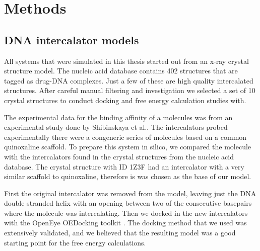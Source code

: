 \chapter{Methods}

\section{DNA intercalator models}

All systems that were simulated in this thesis started out from an x-ray crystal structure model. The nucleic acid database \cite{berman1992nucleic} contains 402 structures that are tagged as drug-DNA complexes. Just a few of these are high quality intercalated structures. After careful manual filtering and investigation we selected a set of 10 crystal structures to conduct docking and free energy calculation studies with.

The experimental data for the binding affinity of a molecules was from an experimental study done by Shibinskaya et al.\cite{shibinskaya2011synthesis}. The intercalators probed experimentally there were a congeneric series of molecules based on a common quinoxaline scaffold. To prepare this system in silico, we compared the molecule with the intercalators found in the crystal structures from the nucleic acid database. The crystal structure with ID 1Z3F had an intercalator with a very similar scaffold to quinoxaline, therefore is was chosen as the base of our model.

First the original intercalator was removed from the model, leaving just the DNA double stranded helix with an opening between two of the consecutive basepairs where the molecule was intercalating. Then we docked in the new intercalators with the OpenEye OEDocking toolkit \cite{kelley2015posit}. The docking method that we used was extensively validated, and we believed that the resulting model was a good starting point for the free energy calculations.    


